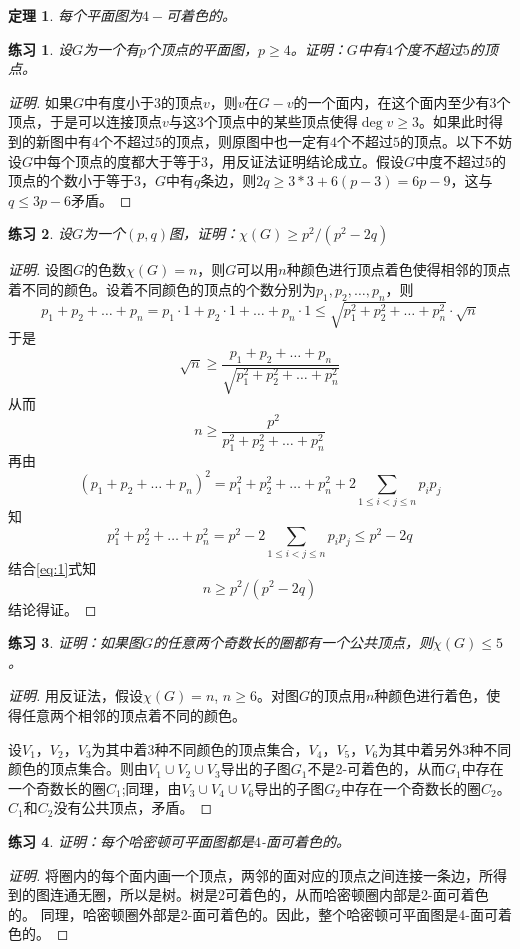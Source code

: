 \documentclass{article}
\newtheorem{Thm}{定理}
\newtheorem{Exercise}{练习}
\begin{document}
\begin{CJK*}{UTF8}{gbsn}
  \begin{Thm}
    每个平面图为$4-$可着色的。
  \end{Thm}
  \begin{Exercise}
    设$G$为一个有$p$个顶点的平面图，$p\geq 4$。证明：$G$中有$4$个度不超过$5$的顶点。
     \end{Exercise}
     \begin{proof}[证明]
       如果$G$中有度小于$3$的顶点$v$，则$v$在$G-v$的一个面内，在这个面内至少有$3$个顶点，于是可以连接顶点$v$与这$3$个顶点中的某些顶点使得$\deg v\geq 3$。如果此时得到的新图中有$4$个不超过$5$的顶点，则原图中也一定有$4$个不超过$5$的顶点。以下不妨设$G$中每个顶点的度都大于等于$3$，用反证法证明结论成立。假设$G$中度不超过$5$的顶点的个数小于等于$3$，$G$中有$q$条边，则$2q\geq 3 * 3 + 6(p-3)=6p-9$，这与$q\leq 3p-6$矛盾。
     \end{proof}
  \begin{Exercise}设$G$为一个$(p,q)$图，证明：$\chi(G) \geq p^2/(p^2-2q)$
  \end{Exercise}
  \begin{proof}[证明]  设图$G$的色数$\chi(G)=n$，则$G$可以用$n$种颜色进行顶点着色使得相邻的顶点着不同的颜色。设着不同颜色的顶点的个数分别为$p_1,p_2,\ldots,p_n$，则
    \[p_1+p_2+\ldots +p_n = p_1 \cdot 1 + p_2\cdot 1 + \ldots + p_n\cdot 1 \leq \sqrt{p_1^2 + p_2^2 + \ldots + p_n^2} \cdot \sqrt{n}\]
    于是
    \[\sqrt{n} \geq \frac{p_1+p_2+\ldots + p_n}{\sqrt{p_1^2 + p_2^2 + \ldots + p_n^2}}\]
    从而
    \begin{equation}
      \label{eq:1}
    n \geq \frac{p^2}{p_1^2 + p_2^2 + \ldots + p_n^2}    
    \end{equation}
    再由
    \[(p_1+p_2+\ldots + p_n)^2 = p_1^2 + p_2^2 + \ldots + p_n^2 + 2\sum_{1\leq i<j\leq n}p_ip_j\]
    知
    \[p_1^2 + p_2^2 + \ldots + p_n^2=p^2-2\sum_{1\leq i<j\leq n}p_ip_j\leq p^2-2q\]
    结合\eqref{eq:1}式知
    \[n \geq p^2/(p^2-2q)\]
    结论得证。
  \end{proof}
  \begin{Exercise}
    证明：如果图$G$的任意两个奇数长的圈都有一个公共顶点，则$\chi (G) \leq 5$。
  \end{Exercise}
  \begin{proof}[证明]
    用反证法，假设$\chi(G)=n$, $n \geq 6$。对图$G$的顶点用$n$种颜色进行着色，使得任意两个相邻的顶点着不同的颜色。
  
    设$V_1$，$V_2$，$V_3$为其中着3种不同颜色的顶点集合，$V_4$，$V_5$，$V_6$为其中着另外3种不同颜色的顶点集合。则由$V_1\cup V_2\cup V_3$导出的子图$G_1$不是2-可着色的，从而$G_1$中存在一个奇数长的圈$C_1$;同理，由$V_3\cup V_4\cup V_6$导出的子图$G_2$中存在一个奇数长的圈$C_2$。$C_1$和$C_2$没有公共顶点，矛盾。
  \end{proof}
  \begin{Exercise}
    证明：每个哈密顿可平面图都是$4$-面可着色的。
    \end{Exercise}
    \begin{proof}[证明]
    将圈内的每个面内画一个顶点，两邻的面对应的顶点之间连接一条边，所得到的图连通无圈，所以是树。树是2可着色的，从而哈密顿圈内部是2-面可着色的。
    同理，哈密顿圈外部是2-面可着色的。因此，整个哈密顿可平面图是$4$-面可着色的。
    \end{proof}


\end{CJK*}
\end{document}
